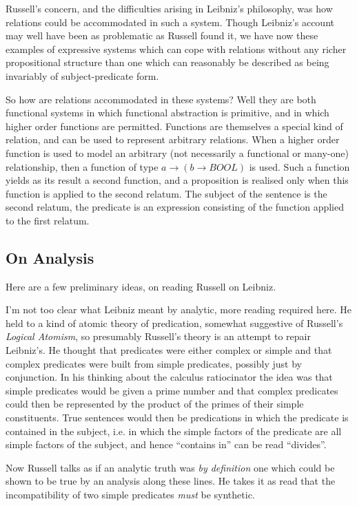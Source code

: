\documentclass{rbjk}
\begin{document}
\begin{article}
Russell's concern, and the difficulties arising in Leibniz's philosophy, was how relations could be accommodated in such a system.
Though Leibniz's account may well have been as problematic as Russell found it, we have now these examples of expressive systems which can cope with relations without any richer propositional structure than one which can reasonably be described as being invariably of subject-predicate form.

So how are relations accommodated in these systems?
Well they are both functional systems in which functional abstraction is primitive, and in which higher order functions are permitted.
Functions are themselves a special kind of relation, and can be used to represent arbitrary relations.
When a higher order function is used to model an arbitrary (not necessarily a functional or many-one) relationship, then a function of type $a \rightarrow (b \rightarrow BOOL)$ is used.
Such a function yields as its result a second function, and a proposition is realised only when this function is applied to the second relatum.
The subject of the sentence is the second relatum, the predicate is an expression consisting of the function applied to the first relatum.

\subsection{On Analysis}

Here are a few preliminary ideas, on reading Russell on Leibniz.

I'm not too clear what Leibniz meant by analytic, more reading required here.
He held to a kind of atomic theory of predication, somewhat suggestive of Russell's {\it Logical Atomism}, so presumably Russell's theory is an attempt to repair Leibniz's.
He thought that predicates were either complex or simple and that complex predicates were built from simple predicates, possibly just by conjunction.
In his thinking about the calculus ratiocinator the idea was that simple predicates would be given a prime number and that complex predicates could then be represented by the product of the primes of their simple constituents.
True sentences would then be predications in which the predicate is contained in the subject, i.e. in which the simple factors of the predicate are all simple factors of the subject, and hence ``contains in'' can be read ``divides''.

Now Russell talks as if an analytic truth was {\it by definition} one which could be shown to be true by an analysis along these lines.
He takes it as read that the incompatibility of two simple predicates {\it must} be synthetic.


\end{article}
\end{document}
